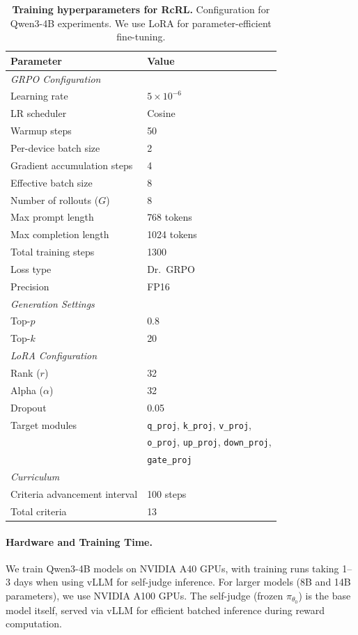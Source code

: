 \documentclass{article}
\theoremstyle{plain}
\theoremstyle{definition}
\theoremstyle{remark}
\begin{document}
\begin{table}[h]
\centering
\small
\caption{\textbf{Training hyperparameters for RcRL.} Configuration for Qwen3-4B experiments. We use LoRA for parameter-efficient fine-tuning.}
\begin{tabular}{ll}
\toprule
\textbf{Parameter} & \textbf{Value} \\
\midrule
\multicolumn{2}{l}{\textit{GRPO Configuration}} \\
Learning rate & $5 \times 10^{-6}$ \\
LR scheduler & Cosine \\
Warmup steps & 50 \\
Per-device batch size & 2 \\
Gradient accumulation steps & 4 \\
Effective batch size & 8 \\
Number of rollouts ($G$) & 8 \\
Max prompt length & 768 tokens \\
Max completion length & 1024 tokens \\
Total training steps & 1300 \\
Loss type & Dr.\ GRPO \\
Precision & FP16 \\
\midrule
\multicolumn{2}{l}{\textit{Generation Settings}} \\
Top-$p$ & 0.8 \\
Top-$k$ & 20 \\
\midrule
\multicolumn{2}{l}{\textit{LoRA Configuration}} \\
Rank ($r$) & 32 \\
Alpha ($\alpha$) & 32 \\
Dropout & 0.05 \\
Target modules & \texttt{q\_proj}, \texttt{k\_proj}, \texttt{v\_proj}, \\
& \texttt{o\_proj}, \texttt{up\_proj}, \texttt{down\_proj}, \\
& \texttt{gate\_proj} \\
\midrule
\multicolumn{2}{l}{\textit{Curriculum}} \\
Criteria advancement interval & 100 steps \\
Total criteria & 13 \\
\bottomrule
\end{tabular}
\label{tab:training-config}
\end{table}

\paragraph{Hardware and Training Time.} We train Qwen3-4B models on NVIDIA A40 GPUs, with training runs taking 1--3 days when using vLLM for self-judge inference. For larger models (8B and 14B parameters), we use NVIDIA A100 GPUs. The self-judge (frozen $\pi_{\theta_0}$) is the base model itself, served via vLLM for efficient batched inference during reward computation.
\end{document}
